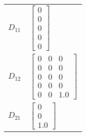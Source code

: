 \begin{tabular}{cl}
 $D_{11}$ & $\left[\begin{matrix}0\\0\\0\\0\\0\end{matrix}\right]$                                                                                                                                          \\
 $D_{12}$ & $\left[\begin{matrix}0 & 0 & 0\\0 & 0 & 0\\0 & 0 & 0\\0 & 0 & 0\\0 & 0 & 1.0\end{matrix}\right]$                                                                                                \\
 $D_{21}$ & $\left[\begin{matrix}0\\0\\1.0\end{matrix}\right]$                                                                                                                                              \\
\hline
\end{tabular}